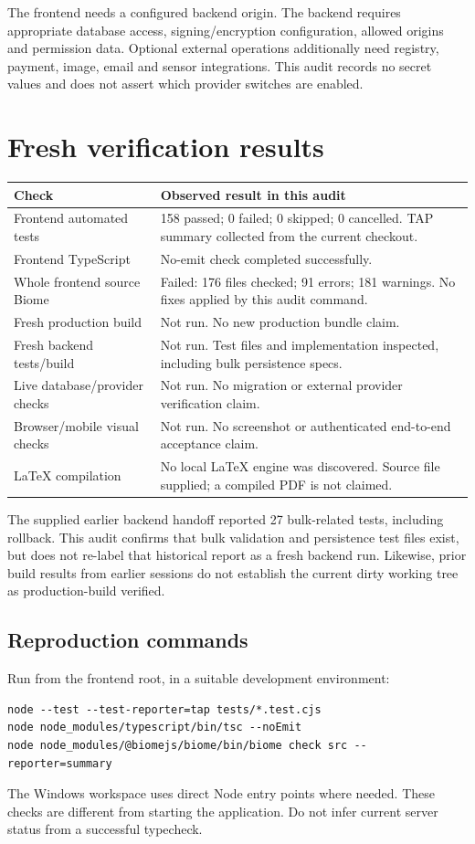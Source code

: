 \documentclass[11pt,a4paper]{article}
\begin{document}
The frontend needs a configured backend origin. The backend requires appropriate database access, signing/encryption configuration, allowed origins and permission data. Optional external operations additionally need registry, payment, image, email and sensor integrations. This audit records no secret values and does not assert which provider switches are enabled.

\section{Fresh verification results}
\begin{tabularx}{\textwidth}{L{0.30\textwidth}X}
\toprule \textbf{Check} & \textbf{Observed result in this audit}\\
\midrule
Frontend automated tests & 158 passed; 0 failed; 0 skipped; 0 cancelled. TAP summary collected from the current checkout.\\
Frontend TypeScript & No-emit check completed successfully.\\
Whole frontend source Biome & Failed: 176 files checked; 91 errors; 181 warnings. No fixes applied by this audit command.\\
Fresh production build & Not run. No new production bundle claim.\\
Fresh backend tests/build & Not run. Test files and implementation inspected, including bulk persistence specs.\\
Live database/provider checks & Not run. No migration or external provider verification claim.\\
Browser/mobile visual checks & Not run. No screenshot or authenticated end-to-end acceptance claim.\\
LaTeX compilation & No local LaTeX engine was discovered. Source file supplied; a compiled PDF is not claimed.\\
\bottomrule
\end{tabularx}

The supplied earlier backend handoff reported 27 bulk-related tests, including rollback. This audit confirms that bulk validation and persistence test files exist, but does not re-label that historical report as a fresh backend run. Likewise, prior build results from earlier sessions do not establish the current dirty working tree as production-build verified.

\subsection{Reproduction commands}
Run from the frontend root, in a suitable development environment:
\begin{lstlisting}
node --test --test-reporter=tap tests/*.test.cjs
node node_modules/typescript/bin/tsc --noEmit
node node_modules/@biomejs/biome/bin/biome check src --reporter=summary
\end{lstlisting}
The Windows workspace uses direct Node entry points where needed. These checks are different from starting the application. Do not infer current server status from a successful typecheck.
\end{document}
